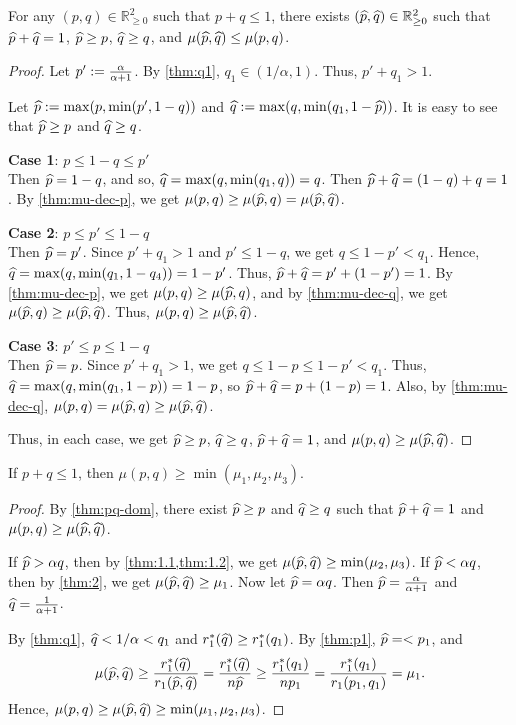 \begin{lemma}
\label{thm:pq-dom}
For any $(p, q) \in \mathbb{R}_{\ge 0}^2$ such that $p + q \le 1$,
there exists $(\widehat{p}, \widehat{q}) \in \mathbb{R}_{\ge 0}^2$ such that
$\widehat{p} + \widehat{q} = 1$, $\widehat{p} \ge p$, $\widehat{q} \ge q$,
and $\mu(\widehat{p}, \widehat{q}) \le \mu(p, q)$.
\end{lemma}
\begin{proof}
Let $p' := \frac{\alpha}{\alpha+1}$.
By \cref{thm:q1}, $q_1 \in (1/\alpha, 1)$.
Thus, $p' + q_1 > 1$.

Let $\widehat{p} := \max(p, \min(p', 1-q))$
and $\widehat{q} := \max(q, \min(q_1, 1-\widehat{p}))$.
It is easy to see that $\widehat{p} \ge p$ and $\widehat{q} \ge q$.

\textbf{Case 1}: $p \le 1-q \le p'$
\\ Then $\widehat{p} = 1-q$, and so, $\widehat{q} = \max(q, \min(q_1, q)) = q$.
Then $\widehat{p} + \widehat{q} = (1-q) + q = 1$.
By \cref{thm:mu-dec-p}, we get
$\mu(p, q) \ge \mu(\widehat{p}, q) = \mu(\widehat{p}, \widehat{q})$.

\textbf{Case 2}: $p \le p' \le 1-q$
\\ Then $\widehat{p} = p'$.
Since $p' + q_1 > 1$ and $p' \le 1-q$, we get $q \le 1-p' < q_1$.
Hence, $\widehat{q} = \max(q, \min(q_1, 1-q_4)) = 1-p'$.
Thus, $\widehat{p} + \widehat{q} = p' + (1-p') = 1$.
By \cref{thm:mu-dec-p}, we get $\mu(p, q) \ge \mu(\widehat{p}, q)$,
and by \cref{thm:mu-dec-q}, we get $\mu(\widehat{p}, q) \ge \mu(\widehat{p}, \widehat{q})$.
Thus, $\mu(p, q) \ge \mu(\widehat{p}, \widehat{q})$.

\textbf{Case 3}: $p' \le p \le 1-q$
\\ Then $\widehat{p} = p$.
Since $p' + q_1 > 1$, we get $q \le 1-p \le 1-p' < q_1$.
Thus, $\widehat{q} = \max(q, \min(q_1, 1-p)) = 1-p$, so $\widehat{p} + \widehat{q} = p + (1-p) = 1$.
Also, by \cref{thm:mu-dec-q}, $\mu(p, q) = \mu(\widehat{p}, q) \ge \mu(\widehat{p}, \widehat{q})$.

Thus, in each case, we get $\widehat{p} \ge p$, $\widehat{q} \ge q$,
$\widehat{p} + \widehat{q} = 1$, and $\mu(p, q) \ge \mu(\widehat{p}, \widehat{q})$.
\end{proof}

\begin{lemma}
\label{thm:3}
If $p + q \le 1$, then $\mu(p, q) \ge \min(\mu_1, \mu_2, \mu_3)$.
\end{lemma}
\begin{proof}
By \cref{thm:pq-dom}, there exist $\widehat{p} \ge p$ and $\widehat{q} \ge q$
such that $\widehat{p} + \widehat{q} = 1$ and $\mu(p, q) \ge \mu(\widehat{p}, \widehat{q})$.

If $\widehat{p} > \alpha q$, then by \cref{thm:1.1,thm:1.2},
we get $\mu(\widehat{p}, \widehat{q}) \ge \min(\mu_2, \mu_3)$.
If $\widehat{p} < \alpha q$, then by \cref{thm:2}, we get
$\mu(\widehat{p}, \widehat{q}) \ge \mu_1$.
Now let $\widehat{p} = \alpha q$. Then $\widehat{p} = \frac{\alpha}{\alpha+1}$ and $\widehat{q} = \frac{1}{\alpha+1}$.

By \cref{thm:q1}, $\widehat{q} < 1/\alpha < q_1$ and $r_1^*(\widehat{q}) \ge r_1^*(q_1)$.
By \cref{thm:p1}, $\widehat{p} = < p_1$, and
\[ \mu(\widehat{p}, \widehat{q}) \ge \frac{r_1^*(\widehat{q})}{r_1(\widehat{p}, \widehat{q})} = \frac{r_1^*(\widehat{q})}{n\widehat{p}}
    \ge \frac{r_1^*(q_1)}{np_1} = \frac{r_1^*(q_1)}{r_1(p_1, q_1)} = \mu_1. \]
Hence, $\mu(p, q) \ge \mu(\widehat{p}, \widehat{q}) \ge \min(\mu_1, \mu_2, \mu_3)$.
\end{proof}
